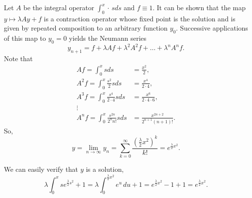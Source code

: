 \documentclass{homework}
\begin{document}

\begin{solution}
  Let $A$ be the integral operator $\int_0^x \cdot \,s ds$ and $f \equiv 1$. It can be shown that the map $y\mapsto \lambda Ay + f$ is a contraction operator whose fixed point is the solution and is given by repeated composition to an arbitrary function $y_0$.  Successive applications of this map to $y_0 = 0$ yields the Neumann series
  \begin{equation}
    y_{n+1} = f + \lambda Af + \lambda^2 A^2 f + \dots + \lambda^n A^n f. \label{neumann}
  \end{equation}
  Note that
  \begin{align}
    A f = \int_0^x s ds &= \frac {x^2}2, \nonumber\\
    A^2 f = \int_0^x \frac {s^2}2 s ds &= \frac {x^4}{2\cdot4}, \nonumber\\
    A^3 f = \int_0^x \frac {s^4}{2\cdot4} s ds &= \frac {x^6}{2\cdot4\cdot6}, \nonumber\\
    \vdots\nonumber\\
    A^n f = \int_0^x \frac {s^{2n} }{2^nn!} sds &= \frac {x^{2n+2}}{2^{n+1}(n+1)!}. \label{kern1}
  \end{align}
  So,%
  $$
    y = \lim_{n\to\infty} y_n = \sum_{k=0}^\infty \frac{\left( \frac \lambda 2 x^2 \right)^k}{k!} = e^{\frac\lambda 2x^2}.
  $$

  We can easily verify that $y$ is a solution,
  $$
    \lambda \int_0^x s e^{\frac\lambda2 s^2} + 1 = \lambda \int_0^{\frac \lambda2 x^2} e^u\,du+1 = e^{\frac\lambda2 x^2} -1 + 1=e^{\frac\lambda2 x^2}.
  $$
  \end{solution}
\newpage

\end{document}
